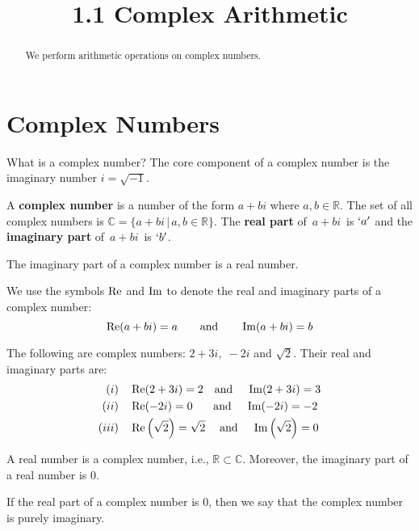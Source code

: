 \documentclass[handout]{ximera}
\title{1.1 Complex Arithmetic}
\begin{document}
\begin{abstract}
We perform arithmetic operations on complex numbers.
\end{abstract}

\maketitle

\section{Complex Numbers}

What is a complex number?  The core component of a complex number is the imaginary number $i = \sqrt{-1}$.

\begin{definition}
A {\bf complex number} is a number of the form $a+bi$ where $a,b \in \mathbb{R}$. 
The set of all complex numbers is $\mathbb{C}= \{a+bi \,|\, a,b \in \mathbb{R}\}$. 
The {\bf real part} of $\,a+bi\,$ is $\lq a \rq$ and the {\bf imaginary part} of $\,a+bi\,$ is $\lq b \rq$.
\end{definition}

\begin{remark}
The imaginary part of a complex number is a real number.
\end{remark}

We use the symbols $\operatorname{Re}$ and $\operatorname{Im}$ to denote the real and imaginary parts of a complex number:
\[
\operatorname{Re}(a+bi) = a \qquad \mbox{and} \qquad \operatorname{Im}(a+bi) = b
\]


\begin{example}[Example 1] 
The following are complex numbers: $2+3i, \; -2i$ and $\sqrt 2$.
Their real and imaginary parts are:
\begin{align*}
(i)& \quad \operatorname{Re}(2+3i) = 2 \quad \mbox{and} \quad \;\operatorname{Im}(2+3i) = 3 \\
(ii)& \quad \operatorname{Re}(-2i) = 0 \quad \;\;\; \mbox{and} \quad \;\operatorname{Im}(-2i) = -2 \\
(iii)& \quad \operatorname{Re}\left(\sqrt 2\right) = \sqrt 2 \quad \;\mbox{and} \quad \;\operatorname{Im}\left(\sqrt 2\right) = 0 
\end{align*}

\end{example}


\begin{remark}
A real number is a complex number, i.e., $\mathbb{R} \subset \mathbb{C}$. 
Moreover, the imaginary part of a real number is $0$.
\end{remark}
\begin{remark}
If the real part of a complex number is $0$, then we say that the complex number is purely imaginary. 
\end{remark}
\end{document}

